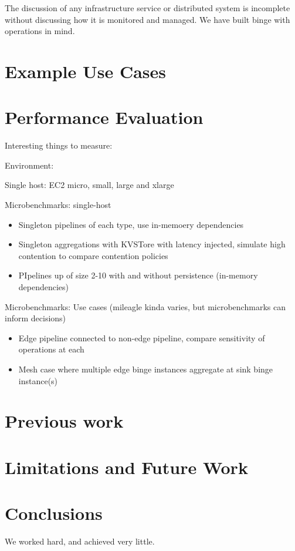 \documentclass[10pt,twocolumn]{article}
\begin{document}
The discussion of any infrastructure service or distributed system is incomplete
without discussing how it is monitored and managed.  We have built binge with
operations in mind.

\section{Example Use Cases}\label{usecases}
\section{Performance Evaluation}\label{evaluation}

Interesting things to measure:

Environment: 

Single host: EC2 micro, small, large and xlarge

Microbenchmarks: single-host

\begin{itemize}
    \item[] Singleton pipelines of each type, use in-memoery dependencies
    \item[] Singleton aggregations with KVSTore  with latency injected, simulate high contention to compare contention policies
    \item[] PIpelines up of size 2-10 with and without persistence (in-memory dependencies)
\end{itemize}

Microbenchmarks: Use cases (mileagle kinda varies, but microbenchmarks can inform decisions)

\begin{itemize}
    \item[] Edge pipeline connected to non-edge pipeline, compare sensitivity of operations at each
    \item[] Mesh case where multiple edge binge instances aggregate at sink binge instance(s)
\end{itemize}


\section{Previous work}\label{previous:work}
\section{Limitations and Future Work}\label{future:work}
\section{Conclusions}\label{conclusions}
We worked hard, and achieved very little.
\end{document}
